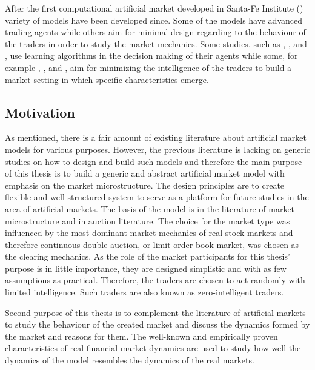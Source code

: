 After the first computational artificial market developed in Santa-Fe Institute
(\citet{SantaFe94}) variety of models have been developed since. Some of the
models have advanced trading agents while others aim for minimal design 
regarding to the behaviour of the traders in order to study the market
mechanics. Some studies, such as \citet{GOYKHMAN20181729}, \citet{IZUMI200535},
\citet{Reinforcement09} and \citet{YEH20102089}, use learning algorithms in the decision making of 
their agents while some, for example \citet{God93}, \citet{Jam96}, \citet{Genoa01} and \citet{Raberto05}, 
aim for minimizing the intelligence of the traders to build a market setting in which
specific characteristics emerge. %



\subsection{Motivation}

As mentioned, there is a fair amount of existing literature about artificial market models for various
purposes. However, the previous literature is lacking on generic studies on how to design
and build such models and therefore the main purpose of this thesis is to build a generic and abstract 
artificial market model with emphasis on the market microstructure. The design principles are to create flexible 
and well-structured system to serve as a platform for future studies in the area of artificial markets. 
The basis of the model is in the literature of market microstructure and in auction literature. The choice for the
market type was influenced by the most dominant market mechanics of real stock markets and therefore
continuous double auction, or limit order book market, was chosen as the clearing mechanics. As the 
role of the market participants for this thesis' purpose is in little importance, they are designed
simplistic and with as few assumptions as practical. Therefore, the traders are chosen to act randomly
with limited intelligence. Such traders are also known as zero-intelligent traders. 

Second purpose of this thesis is to complement the literature of artificial markets to study 
the behaviour of the created market and discuss the dynamics formed by the market and reasons for them. %
The well-known and empirically proven characteristics of real financial market dynamics are used to 
study how well the dynamics of the model resembles the dynamics of the real markets.


